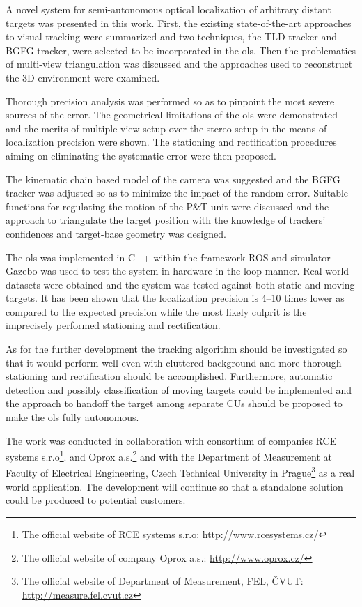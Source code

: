 A novel system for semi-autonomous optical localization of arbitrary distant targets was presented in this work. First, the existing state-of-the-art approaches to visual tracking were summarized and two techniques, the TLD tracker and BGFG tracker, were selected to be incorporated in the \gls{ols}. Then the problematics of multi-view triangulation was discussed and the approaches used to reconstruct the 3D environment were examined.

Thorough precision analysis was performed so as to pinpoint the most severe sources of the error. The geometrical limitations of the \gls{ols} were demonstrated and the merits of multiple-view setup over the stereo setup in the means of localization precision were shown. The stationing and rectification procedures aiming on eliminating the systematic error were then proposed. 

The kinematic chain based model of the camera was suggested and the BGFG tracker was adjusted so as to minimize the impact of the random error. Suitable functions for regulating the motion of the P\&T unit were discussed and the approach to triangulate the target position with the knowledge of trackers' confidences and target-base geometry was designed.

The \gls{ols} was implemented in C++ within the framework ROS and simulator Gazebo was used to test the system in hardware-in-the-loop manner. Real world datasets were obtained and the system was tested against both static and moving targets. It has been shown that the localization precision is 4--10 times lower as compared to the expected precision while the most likely culprit is the imprecisely performed stationing and rectification.

As for the further development the tracking algorithm should be investigated so that it would perform well even with cluttered background and more thorough stationing and rectification should be accomplished. Furthermore, automatic detection and possibly classification of moving targets could be implemented and the approach 
to handoff the target among separate CUs should be proposed to make the \gls{ols} fully autonomous.

The work was conducted in collaboration with consortium of companies RCE systems s.r.o\footnote{The official website of RCE systems s.r.o: \url{http://www.rcesystems.cz/}}. and Oprox a.s.\footnote{The official website of company Oprox a.s.: \url{http://www.oprox.cz/}} and with the Department of Measurement at Faculty of Electrical Engineering, Czech Technical University in Prague\footnote{The official website of Department of Measurement, FEL, ČVUT: \url{http://measure.fel.cvut.cz}} as a real world application. The development will continue so that a standalone solution could be produced to potential customers.
